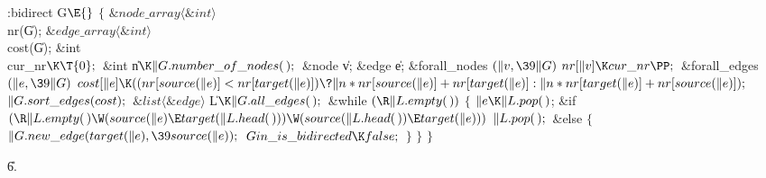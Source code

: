 \Y\B\4:bidirect G\X${}\E{}$\6
${}\{{}$\1\6
${}\&{node\_array}\langle\&{int}\rangle{}$ \\{nr}(\|G);\6
${}\&{edge\_array}\langle\&{int}\rangle{}$ \\{cost}(\|G);\6
\&{int} \\{cur\_nr}${}\K\T{0};{}$\6
\&{int} \|n${}\K\|G.\\{number\_of\_nodes}(\,);{}$\6
\&{node} \|v;\6
\&{edge} \|e;\7
\&{forall\_nodes} ${}(\|v,\39\|G){}$\1\5
${}\\{nr}[\|v]\K\\{cur\_nr}\PP;{}$\2\6
\&{forall\_edges} ${}(\|e,\39\|G){}$\1\5
${}\\{cost}[\|e]\K((\\{nr}[\\{source}(\|e)]<\\{nr}[\\{target}(\|e)])\?\|n*%
\\{nr}[\\{source}(\|e)]+\\{nr}[\\{target}(\|e)]:\|n*\\{nr}[\\{target}(\|e)]+%
\\{nr}[\\{source}(\|e)]);{}$\2\6
${}\|G.\\{sort\_edges}(\\{cost});{}$\7
${}\&{list}\langle\&{edge}\rangle{}$ \|L${}\K\|G.\\{all\_edges}(\,);{}$\7
\&{while} ${}(\R\|L.\\{empty}(\,)){}$\5
${}\{{}$\1\6
${}\|e\K\|L.\\{pop}(\,){}$;\6
\&{if} ${}(\R\|L.\\{empty}(\,)\W(\\{source}(\|e)\E\\{target}(\|L.\\{head}(\,)))%
\W(\\{source}(\|L.\\{head}(\,))\E\\{target}(\|e))){}$\1\5
${}\|L.\\{pop}(\,);{}$\2\6
\&{else}\5
${}\{{}$\1\6
${}\|G.\\{new\_edge}(\\{target}(\|e),\39\\{source}(\|e));{}$\6
${}\\{Gin\_is\_bidirected}\K\\{false};{}$\6
\4${}\}{}$\2\6
\4${}\}{}$\2\6
\4${}\}{}$\2\par
\U6.\fi

